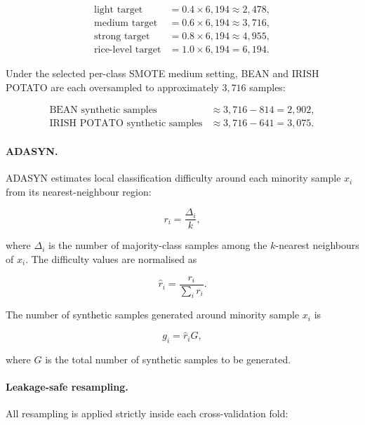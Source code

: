 \[
\begin{aligned}
\text{light target}  &= 0.4 \times 6{,}194 \approx 2{,}478,\\
\text{medium target} &= 0.6 \times 6{,}194 \approx 3{,}716,\\
\text{strong target} &= 0.8 \times 6{,}194 \approx 4{,}955,\\
\text{rice-level target} &= 1.0 \times 6{,}194 = 6{,}194.
\end{aligned}
\]

Under the selected per-class SMOTE medium setting, BEAN and IRISH POTATO
are each oversampled to approximately \(3{,}716\) samples:

\[
\begin{aligned}
\text{BEAN synthetic samples} &\approx 3{,}716 - 814 = 2{,}902,\\
\text{IRISH POTATO synthetic samples} &\approx 3{,}716 - 641 = 3{,}075.
\end{aligned}
\]

\paragraph{ADASYN.}
ADASYN estimates local classification difficulty around each minority
sample \(x_i\) from its nearest-neighbour region:

\begin{equation}
\label{eq:adasyn_difficulty}
r_i =
\frac{\Delta_i}{k},
\end{equation}

where \(\Delta_i\) is the number of majority-class samples among the
\(k\)-nearest neighbours of \(x_i\). The difficulty values are normalised as

\begin{equation}
\label{eq:adasyn_normalised}
\hat{r}_i =
\frac{r_i}{\sum_i r_i}.
\end{equation}

The number of synthetic samples generated around minority sample \(x_i\) is

\begin{equation}
\label{eq:adasyn_generation}
g_i =
\hat{r}_i G,
\end{equation}

where \(G\) is the total number of synthetic samples to be generated.

\paragraph{Leakage-safe resampling.}
All resampling is applied strictly inside each cross-validation fold:

